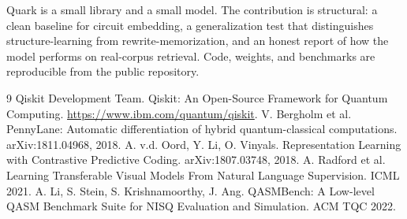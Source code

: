 \documentclass[11pt]{article}
\begin{document}
Quark is a small library and a small model. The contribution is structural: a clean baseline for circuit embedding, a generalization test that distinguishes structure-learning from rewrite-memorization, and an honest report of how the model performs on real-corpus retrieval. Code, weights, and benchmarks are reproducible from the public repository.


\begin{thebibliography}{9}
 Qiskit Development Team. Qiskit: An Open-Source Framework for Quantum Computing. \url{https://www.ibm.com/quantum/qiskit}.
 V. Bergholm et al. PennyLane: Automatic differentiation of hybrid quantum-classical computations. arXiv:1811.04968, 2018.
 A. v.d. Oord, Y. Li, O. Vinyals. Representation Learning with Contrastive Predictive Coding. arXiv:1807.03748, 2018.
 A. Radford et al. Learning Transferable Visual Models From Natural Language Supervision. ICML 2021.
 A. Li, S. Stein, S. Krishnamoorthy, J. Ang. QASMBench: A Low-level QASM Benchmark Suite for NISQ Evaluation and Simulation. ACM TQC 2022.
\end{thebibliography}
\end{document}
